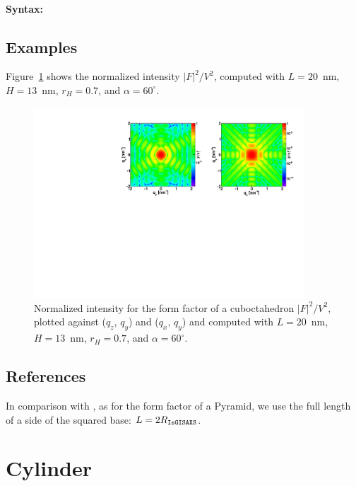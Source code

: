 \paragraph{Syntax:} 

\subsection{Examples}
Figure~\ref{figFFcuboctahEx} shows the normalized intensity $|F|^2/V^2$, computed with $L=20$~nm, $H=13$~nm, $r_H=0.7$, and $\alpha=60^{\circ}$.
\begin{figure}[h]
\begin{center}
\includegraphics[width=0.9\textwidth]{Figures/figffcuboctah}
\end{center}
\caption{Normalized intensity for the form factor of a cuboctahedron $|F|^2/V^2$, plotted against ($q_z$, $q_y$) and  ($q_x$, $q_y$) and computed with $L=20$~nm, $H=13$~nm,
  $r_H=0.7$, and $\alpha=60^{\circ}$.}
\label{figFFcuboctahEx}
\end{figure}

\FloatBarrier

\subsection{References}
In comparison with , as for the  form factor of a  Pyramid,
we use the full length of a side of the squared base: $L=2R_{\rm{\texttt{IsGISAXS}}}$. 
\newpage{\cleardoublepage}
\section{Cylinder} 
 
